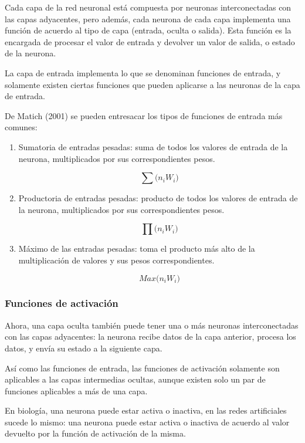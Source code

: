 \documentclass[a4paper,12pt,oneside,spanish]{book}
\begin{document}
Cada capa de la red neuronal está compuesta por neuronas interconectadas con las capas adyacentes, pero además, cada neurona de cada capa implementa una función de acuerdo al tipo de capa (entrada, oculta o salida). Esta función es la encargada de procesar el valor de entrada y devolver un valor de salida, o estado de la neurona.\par

La capa de entrada implementa lo que se denominan funciones de entrada, y solamente existen ciertas funciones que pueden aplicarse a las neuronas de la capa de entrada.\par 

De Matich (2001) \cite{matich} se pueden entresacar los tipos de funciones de entrada más comunes:
\begin{enumerate}
	\item Sumatoria de entradas pesadas: suma de todos los valores de
	entrada de la neurona, multiplicados por sus correspondientes pesos.\par 
	\[\sum \textit{($n_i$$W_i$)} \]
	
	\item Productoria de entradas pesadas: producto de todos los valores de entrada de la neurona, multiplicados por sus correspondientes pesos.\par 
	\[\prod \textit{($n_i$$W_i$)} \]

	\item Máximo de las entradas pesadas: toma el producto más alto de la multiplicación de valores y sus pesos correspondientes.\par 
	
	\[ \textit{Max($n_i$$W_i$)} \]
\end{enumerate}


\subsubsection{Funciones de activación}
Ahora, una capa oculta también puede tener una o más neuronas interconectadas con las capas adyacentes: la neurona recibe datos de la capa anterior, procesa los datos, y envía su estado a la siguiente capa.\par

Así como las funciones de entrada, las funciones de activación solamente son aplicables a las capas intermedias ocultas, aunque existen solo un par de funciones aplicables a más de una capa.\par

En biología, una neurona puede estar activa o inactiva, en las redes artificiales sucede lo mismo: una neurona puede estar activa o inactiva de acuerdo al valor devuelto por la función de activación de la misma.\par
\end{document}
